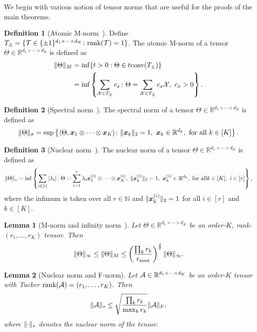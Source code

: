 \documentclass[11pt]{article}
\theoremstyle{plain}
\newtheorem{lem}{Lemma}
\theoremstyle{definition}
\newtheorem{defn}{Definition}
\begin{document}
We begin with various notion of tensor norms that are useful for the proofs of the main theorems.

\begin{defn}[Atomic M-norm~\citep{ghadermarzy2019near}]
Define $T_{\pm}=\{\mathcal{T}\in\{\pm 1 \}^{d_1\times \cdots \times d_K}\colon \text{rank}(\mathcal{T})=1\}$. The atomic M-norm of a tensor $\Theta\in\mathbb{R}^{d_1\times \cdots \times d_K}$ is defined as
\begin{align}
\lVert\Theta\rVert_M&=\inf\{t>0: \Theta\in t\text{conv}(T_{\pm})\}\\
&=\inf\left\{\sum_{\mathcal{X}\in T_{\pm}}c_x\colon \Theta=\sum_{\mathcal{X}\in T_{\pm}} c_x\mathcal{X}, \ c_x>0\right\}.
\end{align}
\end{defn}

\begin{defn}[Spectral norm~\citep{lim2005singular}]
The spectral norm of a tensor $\Theta\in\mathbb{R}^{d_1\times \cdots \times d_K}$ is defined as
\[
\snormSize{}{\Theta}=\sup\left\{\langle \Theta, \mx_1\otimes \cdots \otimes \mx_K\rangle \colon \vnormSize{}{\mx_k}=1,\ \mx_k\in\mathbb{R}^{d_k},\ \text{for all}\ k\in[K]\right\}.
\]
\end{defn}

\begin{defn}[Nuclear norm~\citep{friedland2018nuclear}]
The nuclear norm of a tensor $\Theta\in\mathbb{R}^{d_1\times \cdots \times d_K}$ is defined as
\[
\nnormSize{}{\Theta}=\inf
\left\{
\sum_{i\in[r]}|\lambda_i|\colon \Theta=\sum_{i=1}^r \lambda_i\mx^{(i)}_1\otimes \cdots \otimes \mx^{(i)}_K,\ \vnormSize{}{\mx^{(i)}_k}=1,\ \mx^{(i)}_k\in\mathbb{R}^{d_k},\ \text{for all} k\in[K],\ i\in[r]
\right\},
\]
where the infimum is taken over all $r\in\mathbb{N}$ and $\lVert\bm x^{(i)}_k\rVert_2=1$ for all $i\in[r]$ and $k\in[K]$.
\end{defn}



\begin{lem}[M-norm and infinity norm~\citep{ghadermarzy2019near}]\label{lem:Mnormbound}
Let $\Theta\in\mathbb{R}^{d_1\times \cdots \times d_K}$ be an order-$K$, rank-$(r_1,\ldots,r_K)$ tensor. Then
\[
\lVert\Theta\rVert_\infty\leq \lVert\Theta\rVert_M\leq \left(\prod_k r_k \over r_{\max}\right)^{3\over 2} \lVert\Theta\rVert_\infty.
\]
\end{lem}


\begin{lem}[Nuclear norm and F-norm] \label{lem:nuclear}
Let $\mathcal{A}\in\mathbb{R}^{d_1\times\cdots\times d_K}$ be an order-$K$ tensor with Tucker $\text{rank}(\mathcal{A})=(r_1,\ldots,r_K)$. Then
\[
\lVert\mathcal{A}\rVert_* \leq \sqrt{\prod_k r_k\over \max_k r_k} \lVert\mathcal{A}\rVert_F,
\]
where $\lVert\cdot\rVert_*$ denotes the nuclear norm of the tensor.
\end{lem}
\end{document}
